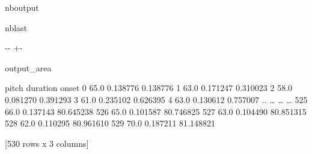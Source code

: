 \documentclass[letterpaper,10pt,english]{sphinxmanual}
\newlength\nbsphinxcodecellspacing
\begin{document}
\begin{sphinxuseclass}{nboutput}
\begin{sphinxuseclass}{nblast}
{

\kern-\sphinxverbatimsmallskipamount\kern-\baselineskip
\kern+\FrameHeightAdjust\kern-\fboxrule
\vspace{\nbsphinxcodecellspacing}

\begin{sphinxuseclass}{output_area}
\begin{sphinxuseclass}{}


\begin{sphinxVerbatim}[commandchars=\\\{\}]
\llap{\color{nbsphinxout}[32]:\,\hspace{\fboxrule}\hspace{\fboxsep}}     pitch  duration      onset
0     65.0  0.138776   0.138776
1     63.0  0.171247   0.310023
2     58.0  0.081270   0.391293
3     61.0  0.235102   0.626395
4     63.0  0.130612   0.757007
..     {\ldots}       {\ldots}        {\ldots}
525   66.0  0.137143  80.645238
526   65.0  0.101587  80.746825
527   63.0  0.104490  80.851315
528   62.0  0.110295  80.961610
529   70.0  0.187211  81.148821

[530 rows x 3 columns]
\end{sphinxVerbatim}



\end{sphinxuseclass}
\end{sphinxuseclass}
}

\end{sphinxuseclass}
\end{sphinxuseclass}
\end{document}
